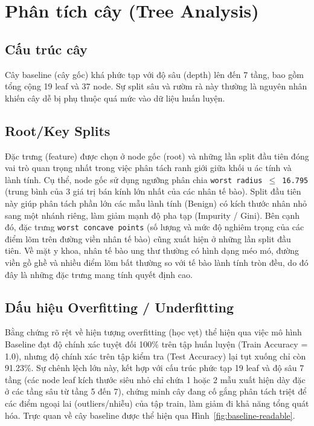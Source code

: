 \chapter{Phân tích cây (Tree Analysis)}
\label{chap:tree-analysis}

\section{Cấu trúc cây}
Cây baseline (cây gốc) khá phức tạp với độ sâu (depth) lên đến 7 tầng, bao gồm tổng cộng 19 leaf và 37 node. Sự split sâu và rườm rà này thường là nguyên nhân khiến cây dễ bị phụ thuộc quá mức vào dữ liệu huấn luyện.

\section{Root/Key Splits}
Đặc trưng (feature) được chọn ở node gốc (root) và những lần split đầu tiên đóng vai trò quan trọng nhất trong việc phân tách ranh giới giữa khối u ác tính và lành tính. Cụ thể, node gốc sử dụng ngưỡng phân chia \texttt{worst radius $\le$ 16.795} (trung bình của 3 giá trị bán kính lớn nhất của các nhân tế bào). Split đầu tiên này giúp phân tách phần lớn các mẫu lành tính (Benign) có kích thước nhân nhỏ sang một nhánh riêng, làm giảm mạnh độ pha tạp (Impurity / Gini). Bên cạnh đó, đặc trưng \texttt{worst concave points} (số lượng và mức độ nghiêm trọng của các điểm lõm trên đường viền nhân tế bào) cũng xuất hiện ở những lần split đầu tiên. Về mặt y khoa, nhân tế bào ung thư thường có hình dạng méo mó, đường viền gồ ghề và nhiều điểm lõm bất thường so với tế bào lành tính tròn đều, do đó đây là những đặc trưng mang tính quyết định cao.

\section{Dấu hiệu Overfitting / Underfitting}
Bằng chứng rõ rệt về hiện tượng overfitting (học vẹt) thể hiện qua việc mô hình Baseline đạt độ chính xác tuyệt đối 100\% trên tập huấn luyện (Train Accuracy = 1.0), nhưng độ chính xác trên tập kiểm tra (Test Accuracy) lại tụt xuống chỉ còn 91.23\%. Sự chênh lệch lớn này, kết hợp với cấu trúc phức tạp 19 leaf và độ sâu 7 tầng (các node leaf kích thước siêu nhỏ chỉ chứa 1 hoặc 2 mẫu xuất hiện dày đặc ở các tầng sâu từ tầng 5 đến 7), chứng minh cây đang cố gắng phân tách triệt để các điểm ngoại lai (outliers/nhiễu) của tập train, làm giảm đi khả năng tổng quát hóa. Trực quan về cây baseline được thể hiện qua Hình~\ref{fig:baseline-readable}.
